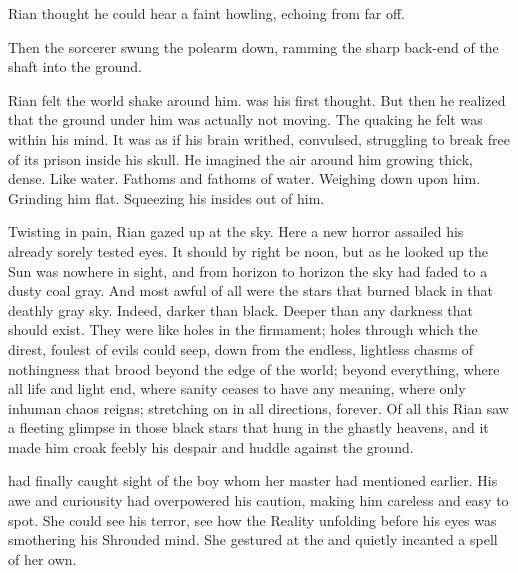 Rian thought he could hear a faint howling, echoing from far off. 

Then the sorcerer swung the polearm down, ramming the sharp back-end of the shaft into the ground. 

Rian felt the world shake around him.  was his first thought. But then he realized that the ground under him was actually not moving. The quaking he felt was within his mind. It was as if his brain writhed, convulsed, struggling to break free of its prison inside his skull. He imagined the air around him growing thick, dense. Like water. Fathoms and fathoms of water. Weighing down upon him. Grinding him flat. Squeezing his insides out of him. 

Twisting in pain, Rian gazed up at the sky. Here a new horror assailed his already sorely tested eyes. 
It should by right be noon, 
but as he looked up the Sun was nowhere in sight, and from horizon to horizon the sky had faded to a dusty coal gray. 
And most awful of all were the stars that burned black in that deathly gray sky. Indeed, darker than black. Deeper than any darkness that should exist. They were like holes in the firmament; holes through which the direst, foulest of evils could seep, down from the endless, lightless chasms of nothingness that brood beyond the edge of the world; beyond everything, where all life and light end, where sanity ceases to have any meaning, where only inhuman chaos reigns; stretching on in all directions, forever. Of all this Rian saw a fleeting glimpse in those black stars that hung in the ghastly heavens, and it made him croak feebly his despair and huddle against the ground. 









\begin{comment}
\subsection{The \ghobal}
\end{comment}

\begin{comment}
\subsubsection{\Criseis}
\end{comment}
\new
\Criseis{} had finally caught sight of the boy whom her master had mentioned earlier. 
His awe and curiousity had overpowered his caution, making him careless and easy to spot. 
She could see his terror, see how the Reality unfolding before his eyes was smothering his Shrouded mind. 
She gestured at the \human{} and quietly incanted a spell of her own. 








